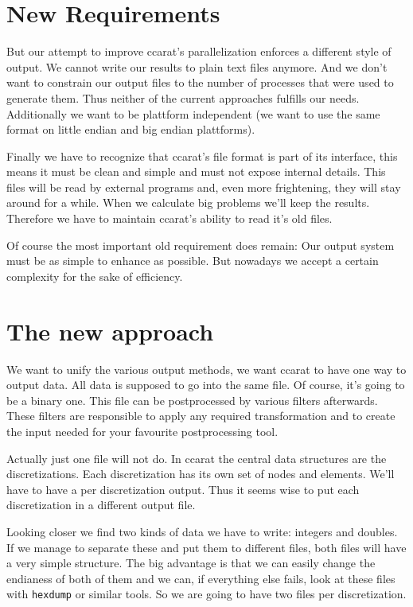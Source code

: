 \section{New Requirements}

But our attempt to improve ccarat's parallelization enforces a different
style of output. We cannot write our results to plain text files anymore.
And we don't want to constrain our output files to the number of processes
that were used to generate them. Thus neither of the current approaches
fulfills our needs. Additionally we want to be plattform independent
(we want to use the same format on little endian and big endian plattforms).

Finally we have to recognize that ccarat's file format is part of
its interface, this means it must be clean and simple and must not
expose internal details. This files will be read by external programs
and, even more frightening, they will stay around for a while. When
we calculate big problems we'll keep the results. Therefore we have
to maintain ccarat's ability to read it's old files.

Of course the most important old requirement does remain: Our output
system must be as simple to enhance as possible. But nowadays we accept
a certain complexity for the sake of efficiency.


\section{The new approach}

We want to unify the various output methods, we want ccarat to have
one way to output data. All data is supposed to go into the same file.
Of course, it's going to be a binary one. This file can be postprocessed
by various filters afterwards. These filters are responsible to apply
any required transformation and to create the input needed for your
favourite postprocessing tool.

Actually just one file will not do. In ccarat the central data structures
are the discretizations. Each discretization has its own set of nodes
and elements. We'll have to have a per discretization output. Thus
it seems wise to put each discretization in a different output file.

Looking closer we find two kinds of data we have to write: integers
and doubles. If we manage to separate these and put them to different
files, both files will have a very simple structure. The big advantage
is that we can easily change the endianess of both of them and we
can, if everything else fails, look at these files with \texttt{hexdump}
or similar tools. So we are going to have two files per discretization.

